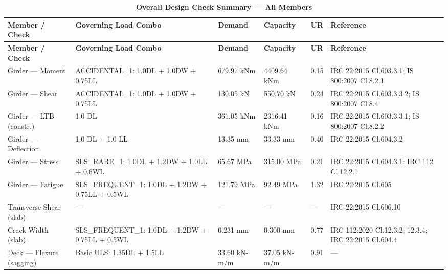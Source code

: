 \documentclass[12pt,a4paper]{report}
\numberwithin{table}{chapter}
\numberwithin{figure}{chapter}
\begin{document}
\vspace{1em}
\begin{longtable}{|C{3.0cm}|L{4.2cm}|C{2.1cm}|C{2.1cm}|C{1.4cm}|>{\centering\arraybackslash}p{2.6cm}|}
\caption{\textbf{Overall Design Check Summary --- All Members}}
\hline
\textbf{Member / Check} & \textbf{Governing Load Combo} & \textbf{Demand} & \textbf{Capacity} & \textbf{UR} & \textbf{Reference} \\[6pt]
\hline
\endfirsthead

\hline
\textbf{Member / Check} & \textbf{Governing Load Combo} & \textbf{Demand} & \textbf{Capacity} & \textbf{UR} & \textbf{Reference} \\[6pt]
\hline
\endhead
Girder --- Moment & ACCIDENTAL\_\allowbreak{}1:\allowbreak{} 1.0DL + 1.0DW + 0.75LL & 679.97 kNm & 4409.64 kNm & 0.15 & IRC 22:2015 Cl.603.3.1; IS 800:2007 Cl.8.2.1 \\[6pt]
\hline
Girder --- Shear & ACCIDENTAL\_\allowbreak{}1:\allowbreak{} 1.0DL + 1.0DW + 0.75LL & 130.05 kN & 550.70 kN & 0.24 & IRC 22:2015 Cl.603.3.3.2; IS 800:2007 Cl.8.4 \\[6pt]
\hline
Girder --- LTB (constr.) & 1.0 DL & 361.05 kNm & 2316.41 kNm & 0.16 & IRC 22:2015 Cl.603.3.3.1; IS 800:2007 Cl.8.2.2 \\[6pt]
\hline
Girder --- Deflection & 1.0 DL + 1.0 LL & 13.35 mm & 33.33 mm & 0.40 & IRC 22:2015 Cl.604.3.2 \\[6pt]
\hline
Girder --- Stress & SLS\_\allowbreak{}RARE\_\allowbreak{}1:\allowbreak{} 1.0DL + 1.2DW + 1.0LL + 0.6WL & 65.67 MPa & 315.00 MPa & 0.21 & IRC 22:2015 Cl.604.3.1; IRC 112 Cl.12.2.1 \\[6pt]
\hline
Girder --- Fatigue & SLS\_\allowbreak{}FREQUENT\_\allowbreak{}1:\allowbreak{} 1.0DL + 1.2DW + 0.75LL + 0.5WL & 121.79 MPa & 92.49 MPa & 1.32 & IRC 22:2015 Cl.605 \\[6pt]
\hline
Transverse Shear (slab) & --- & --- & --- & --- & IRC 22:2015 Cl.606.10 \\[6pt]
\hline
Crack Width (slab) & SLS\_\allowbreak{}FREQUENT\_\allowbreak{}1:\allowbreak{} 1.0DL + 1.2DW + 0.75LL + 0.5WL & 0.231 mm & 0.300 mm & 0.77 & IRC 112:2020 Cl.12.3.2, 12.3.4; IRC 22:2015 Cl.604.4 \\[6pt]
\hline
Deck --- Flexure (sagging) & Basic ULS: 1.35DL + 1.5LL & 33.60 kN-m/m & 37.05 kN-m/m & 0.91 & --- \\[6pt]

\end{longtable}
\end{document}

